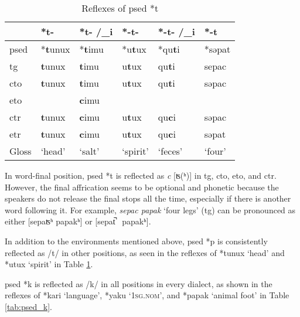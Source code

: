\begin{table}[!htbp]
\centering
\caption{Reflexes of \acl{psed} *t}
\label{tab:psed_t}
\begin{tabular}{llllll}
\hline
           & *t-    & *t- /\_i & *-t-  & *-t- /\_i & *-t    \\ \hline
\acs{psed} & *\textbf{t}unux & *\textbf{t}imu    & *u\textbf{t}ux & *qu\textbf{t}i     & *səpat \\ \hdashline
\acs{tg}   & \textbf{t}unux  & \textbf{t}imu     & u\textbf{t}ux  & qu\textbf{t}i      & sepac  \\
\acs{cto}  & \textbf{t}unux  & \textbf{t}imu     & u\textbf{t}ux  & qu\textbf{t}i      & səpac  \\
\acs{eto}  &        & \textbf{c}imu&       &           &        \\
\acs{ctr}  & \textbf{t}unux  & \textbf{c}imu     & u\textbf{t}ux  & qu\textbf{c}i      & səpac  \\
\acs{etr}  & \textbf{t}unux  & \textbf{c}imu     & u\textbf{t}ux  & qu\textbf{c}i      & səpat  \\ \hline
Gloss      & `head' & `salt'   & `spirit' & `feces'  & `four' \\ \hline
\end{tabular}
\end{table}

In word-final position, \acl{psed} *t is reflected as \textit{c} [ʦ(ʰ)] in \acl{tg}, \acl{cto}, \acl{eto}, and \acl{ctr}. However, the final affrication seems to be optional and phonetic because the speakers do not release the final stops all the time, especially if there is another word following it. For example, \textit{sepac papak} `four legs' (\acs{tg}) can be pronounced as either [sepaʦʰ papakʰ] or [sepat̚ \ papakʰ]. 

In addition to the environments mentioned above, \acl{psed} *p is consistently reflected as /t/ in other positions, as seen in the reflexes of *tunux `head' and *utux `spirit' in Table \ref{tab:psed_t}.

\acl{psed} *k is reflected as /k/ in all positions in every dialect, as shown in the reflexes of *kari `language', *yaku `\textsc{1sg.nom}', and *papak `animal foot' in Table \ref{tab:psed_k}.

